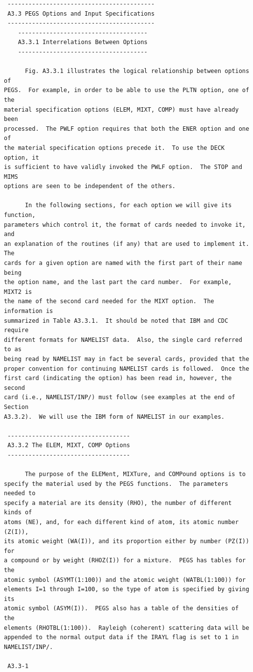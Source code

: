 \begin{verbatim}
 ------------------------------------------
 A3.3 PEGS Options and Input Specifications
 ------------------------------------------
    -------------------------------------
    A3.3.1 Interrelations Between Options
    -------------------------------------

      Fig. A3.3.1 illustrates the logical relationship between options of
PEGS.  For example, in order to be able to use the PLTN option, one of the
material specification options (ELEM, MIXT, COMP) must have already been
processed.  The PWLF option requires that both the ENER option and one of
the material specification options precede it.  To use the DECK option, it
is sufficient to have validly invoked the PWLF option.  The STOP and MIMS
options are seen to be independent of the others.

      In the following sections, for each option we will give its function,
parameters which control it, the format of cards needed to invoke it, and
an explanation of the routines (if any) that are used to implement it.  The
cards for a given option are named with the first part of their name being
the option name, and the last part the card number.  For example, MIXT2 is
the name of the second card needed for the MIXT option.  The information is
summarized in Table A3.3.1.  It should be noted that IBM and CDC require
different formats for NAMELIST data.  Also, the single card referred to as
being read by NAMELIST may in fact be several cards, provided that the
proper convention for continuing NAMELIST cards is followed.  Once the
first card (indicating the option) has been read in, however, the second
card (i.e., NAMELIST/INP/) must follow (see examples at the end of Section
A3.3.2).  We will use the IBM form of NAMELIST in our examples.

 -----------------------------------
 A3.3.2 The ELEM, MIXT, COMP Options
 -----------------------------------

      The purpose of the ELEMent, MIXTure, and COMPound options is to
specify the material used by the PEGS functions.  The parameters needed to
specify a material are its density (RHO), the number of different kinds of
atoms (NE), and, for each different kind of atom, its atomic number (Z(I)),
its atomic weight (WA(I)), and its proportion either by number (PZ(I)) for
a compound or by weight (RHOZ(I)) for a mixture.  PEGS has tables for the
atomic symbol (ASYMT(1:100)) and the atomic weight (WATBL(1:100)) for
elements I=1 through I=100, so the type of atom is specified by giving its
atomic symbol (ASYM(I)).  PEGS also has a table of the densities of the
elements (RHOTBL(1:100)).  Rayleigh (coherent) scattering data will be
appended to the normal output data if the IRAYL flag is set to 1 in
NAMELIST/INP/.

 A3.3-1
\end{verbatim}
